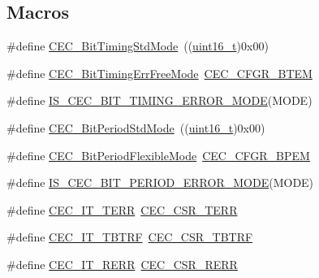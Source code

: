 \subsection*{Macros}
\begin{DoxyCompactItemize}
\item 
\#define \hyperlink{group___c_e_c___bit_timing___mode_gaf6866e5087bb01c1ea4e20a207a1f691}{C\+E\+C\+\_\+\+Bit\+Timing\+Std\+Mode}~((\hyperlink{_p_e___types_8h_a1f1825b69244eb3ad2c7165ddc99c956}{uint16\+\_\+t})0x00)
\item 
\#define \hyperlink{group___c_e_c___bit_timing___mode_ga4fd44675c774985d1f6cd8976b18c947}{C\+E\+C\+\_\+\+Bit\+Timing\+Err\+Free\+Mode}~\hyperlink{group___peripheral___registers___bits___definition_ga8b06cd4e47f4235d8880e1ba0e56e2d7}{C\+E\+C\+\_\+\+C\+F\+G\+R\+\_\+\+B\+T\+EM}
\item 
\#define \hyperlink{group___c_e_c___bit_timing___mode_ga55494269b2c9c55c11130a429f418a8d}{I\+S\+\_\+\+C\+E\+C\+\_\+\+B\+I\+T\+\_\+\+T\+I\+M\+I\+N\+G\+\_\+\+E\+R\+R\+O\+R\+\_\+\+M\+O\+DE}(M\+O\+DE)
\item 
\#define \hyperlink{group___c_e_c___bit_period___mode_ga746ce0a831dfd76a47add310662c7f07}{C\+E\+C\+\_\+\+Bit\+Period\+Std\+Mode}~((\hyperlink{_p_e___types_8h_a1f1825b69244eb3ad2c7165ddc99c956}{uint16\+\_\+t})0x00)
\item 
\#define \hyperlink{group___c_e_c___bit_period___mode_ga5bf4c1b257b837770d4d59c93cca6902}{C\+E\+C\+\_\+\+Bit\+Period\+Flexible\+Mode}~\hyperlink{group___peripheral___registers___bits___definition_ga48c747693ec4dac8e4288ae4c0949def}{C\+E\+C\+\_\+\+C\+F\+G\+R\+\_\+\+B\+P\+EM}
\item 
\#define \hyperlink{group___c_e_c___bit_period___mode_ga3414347854a83bf70748624ec5b8dd49}{I\+S\+\_\+\+C\+E\+C\+\_\+\+B\+I\+T\+\_\+\+P\+E\+R\+I\+O\+D\+\_\+\+E\+R\+R\+O\+R\+\_\+\+M\+O\+DE}(M\+O\+DE)
\item 
\#define \hyperlink{group___c_e_c__interrupts__definition_ga25f97d245f29e04a2d2bbc840389e6b5}{C\+E\+C\+\_\+\+I\+T\+\_\+\+T\+E\+RR}~\hyperlink{group___peripheral___registers___bits___definition_ga273caacb035cb2ec64c721fa6c747c35}{C\+E\+C\+\_\+\+C\+S\+R\+\_\+\+T\+E\+RR}
\item 
\#define \hyperlink{group___c_e_c__interrupts__definition_ga12b00fb3989f9ce9f2f7fc0094c0747d}{C\+E\+C\+\_\+\+I\+T\+\_\+\+T\+B\+T\+RF}~\hyperlink{group___peripheral___registers___bits___definition_ga650bba50140fa01d98abe80bf004a9b6}{C\+E\+C\+\_\+\+C\+S\+R\+\_\+\+T\+B\+T\+RF}
\item 
\#define \hyperlink{group___c_e_c__interrupts__definition_gac015ebba728a69eeb84be1bc56a58ac0}{C\+E\+C\+\_\+\+I\+T\+\_\+\+R\+E\+RR}~\hyperlink{group___peripheral___registers___bits___definition_ga2e33f1d4724efa45fce87ae2fcba6cff}{C\+E\+C\+\_\+\+C\+S\+R\+\_\+\+R\+E\+RR}

\end{DoxyCompactItemize}

